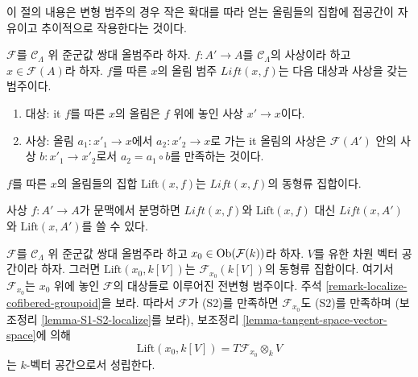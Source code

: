 \noindent
이 절의 내용은 변형 범주의 경우 작은 확대를 따라 얻는 올림들의 집합에
접공간이 자유이고 추이적으로 작용한다는 것이다.

\begin{definition}
\label{definition-lifts}
$\mathcal{F}$를 $\mathcal{C}_\Lambda$ 위 준군값 쌍대 올범주라 하자.
$f: A' \to A$를 $\mathcal{C}_\Lambda$의 사상이라 하고
$x \in \mathcal{F}(A)$라 하자. $f$를 따른 $x$의 올림 범주
$\textit{Lift}(x, f)$는 다음 대상과 사상을 갖는 범주이다.
\begin{enumerate}
\item 대상: {it $f$를 따른 $x$의 올림}은 $f$ 위에 놓인 사상
$x' \to x$이다.
\item 사상: 올림 $a_1 : x'_1 \to x$에서
$a_2 : x'_2 \to x$로 가는 {it 올림의 사상}은
$\mathcal{F}(A')$ 안의 사상 $b : x'_1 \to x'_2$로서
$a_2 = a_1 \circ b$를 만족하는 것이다.
\end{enumerate}
$f$를 따른 $x$의 올림들의 집합 $\text{Lift}(x, f)$는
$\textit{Lift}(x, f)$의 동형류 집합이다.
\end{definition}

\begin{remark}
\label{remark-omit-arrow}
사상 $f: A' \to A$가 문맥에서 분명하면
$\textit{Lift}(x, f)$와 $\text{Lift}(x, f)$ 대신
$\textit{Lift}(x, A')$와 $\text{Lift}(x, A')$를 쓸 수 있다.
\end{remark}

\begin{remark}
\label{remark-tangent-space-lifting}
$\mathcal{F}$를 $\mathcal{C}_\Lambda$ 위 준군값 쌍대 올범주라 하고
$x_0 \in \mathop{\mathrm{Ob}}\nolimits(\mathcal{F}(k))$라 하자. $V$를 유한 차원 벡터 공간이라 하자.
그러면 $\text{Lift}(x_0, k[V])$는
$\mathcal{F}_{x_0}(k[V])$의 동형류 집합이다. 여기서
$\mathcal{F}_{x_0}$는 $x_0$ 위에 놓인 $\mathcal{F}$의 대상들로 이루어진
전변형 범주이다. 주석 \ref{remark-localize-cofibered-groupoid}을 보라.
따라서 $\mathcal{F}$가 (S2)를 만족하면
$\mathcal{F}_{x_0}$도 (S2)를 만족하며
(보조정리 \ref{lemma-S1-S2-localize}를 보라),
보조정리 \ref{lemma-tangent-space-vector-space}에 의해
$$
\text{Lift}(x_0, k[V]) = T\mathcal{F}_{x_0} \otimes_k V
$$
는 $k$-벡터 공간으로서 성립한다.
\end{remark}

